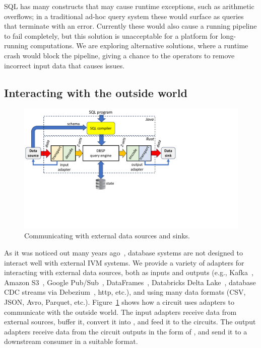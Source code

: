 SQL has many constructs that may cause runtime exceptions, such as
arithmetic overflows; in a traditional ad-hoc query system these
would surface as queries that terminate with an error.  Currently
these would also cause a running pipeline to fail completely, but this
solution is unacceptable for a platform for long-running computations.
We are exploring alternative solutions, where a runtime crash would
block the pipeline, giving a chance to the operators to remove
incorrect input data that causes issues.

\subsection{Interacting with the outside world}

\begin{figure}[h]
  \begin{center}
  \includegraphics[trim={0 2.2inin 3.7in 0},clip,scale=.33]{adapters.pdf}
  \caption{\label{fig:adapters}Communicating with external data
    sources and sinks.}
  \end{center}
\end{figure}

As it was noticed out many years ago~\cite{labio-vldb00}, database
systems are not designed to interact well with external IVM systems.
We provide a variety of adapters for interacting with external data
sources, both as inputs and outputs (e.g., Kafka~\cite{kreps-netdb11},
Amazon S3~\cite{palankar-dadc08}, Google Pub/Sub~\cite{pubsub},
DataFrames~\cite{pandas12}, Databricks Delta
Lake~\cite{armbrust-vldb20}, database CDC streams via
Debezium~\cite{debezium}, http, etc.), and using many data formats
(CSV, JSON, Avro, Parquet, etc.).  Figure~\ref{fig:adapters} shows how
a circuit uses adapters to communicate with the outside world.  The
input adapters receive data from external sources, buffer it, convert
it into \zrs, and feed it to the circuits.  The output adapters
receive data from the circuit outputs in the form of \zrs, and send it
to a downstream consumer in a suitable format.

